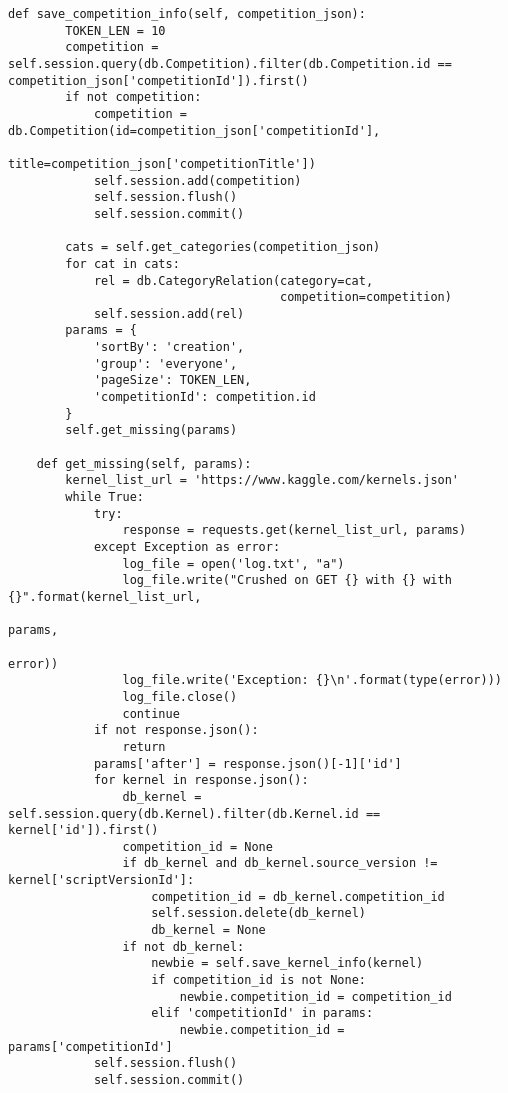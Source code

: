 \begin{lstlisting}[style=app]
    def save_competition_info(self, competition_json):
        TOKEN_LEN = 10
        competition = self.session.query(db.Competition).filter(db.Competition.id == competition_json['competitionId']).first()
        if not competition:
            competition = db.Competition(id=competition_json['competitionId'],
                                         title=competition_json['competitionTitle'])
            self.session.add(competition)
            self.session.flush()
            self.session.commit()

        cats = self.get_categories(competition_json)
        for cat in cats:
            rel = db.CategoryRelation(category=cat,
                                      competition=competition)
            self.session.add(rel)
        params = {
            'sortBy': 'creation',
            'group': 'everyone',
            'pageSize': TOKEN_LEN,
            'competitionId': competition.id
        }
        self.get_missing(params)

    def get_missing(self, params):
        kernel_list_url = 'https://www.kaggle.com/kernels.json'
        while True:
            try:
                response = requests.get(kernel_list_url, params)
            except Exception as error:
                log_file = open('log.txt', "a")
                log_file.write("Crushed on GET {} with {} with {}".format(kernel_list_url,
                                                                          params,
                                                                          error))
                log_file.write('Exception: {}\n'.format(type(error)))
                log_file.close()
                continue
            if not response.json():
                return
            params['after'] = response.json()[-1]['id']
            for kernel in response.json():
                db_kernel = self.session.query(db.Kernel).filter(db.Kernel.id == kernel['id']).first()
                competition_id = None
                if db_kernel and db_kernel.source_version != kernel['scriptVersionId']:
                    competition_id = db_kernel.competition_id
                    self.session.delete(db_kernel)
                    db_kernel = None
                if not db_kernel:
                    newbie = self.save_kernel_info(kernel)
                    if competition_id is not None:
                        newbie.competition_id = competition_id
                    elif 'competitionId' in params:
                        newbie.competition_id = params['competitionId']
            self.session.flush()
            self.session.commit()


\end{lstlisting}
